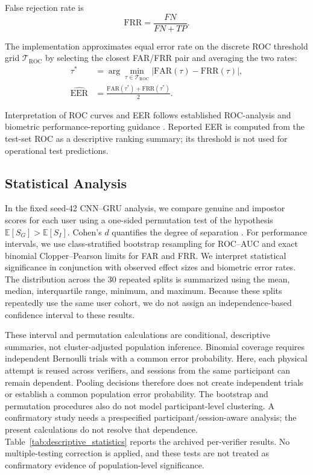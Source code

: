 \documentclass[conference]{IEEEtran}
\begin{document}
False rejection rate is
\begin{equation}
\mathrm{FRR}
=
\frac{FN}{FN+TP}.
\label{eq:frr}
\end{equation}

The implementation approximates equal error rate on the discrete ROC
threshold grid $\mathcal{T}_{\mathrm{ROC}}$ by selecting the closest FAR/FRR
pair and averaging the two rates:
\begin{equation}
\begin{aligned}
\tau^* &= \arg\min_{\tau\in\mathcal{T}_{\mathrm{ROC}}}
|\mathrm{FAR}(\tau)-\mathrm{FRR}(\tau)|,\\
\widehat{\mathrm{EER}} &=
\frac{\mathrm{FAR}(\tau^*)+\mathrm{FRR}(\tau^*)}{2}.
\end{aligned}
\label{eq:eer}
\end{equation}

Interpretation of ROC curves and EER follows established ROC-analysis and biometric performance-reporting guidance \cite{fawcettROC,isoBiometricTesting}.
Reported EER is computed from the test-set ROC as a descriptive ranking
summary; its threshold is not used for operational test predictions.

\subsection{Statistical Analysis}

In the fixed seed-42 CNN--GRU analysis, we compare genuine and impostor scores for each user using a one-sided permutation test of the hypothesis $\mathbb{E}[S_G]>\mathbb{E}[S_I]$. Cohen's $d$ quantifies the degree of separation \cite{cohenPower}. For performance intervals, we use class-stratified bootstrap resampling for ROC--AUC \cite{efronBootstrap} and exact binomial Clopper--Pearson limits \cite{clopperPearson} for FAR and FRR. We interpret statistical significance in conjunction with observed effect sizes and biometric error rates. The distribution across the 30 repeated splits is summarized using the mean, median, interquartile range, minimum, and maximum. Because these splits repeatedly use the same user cohort, we do not assign an independence-based confidence interval to these results.

These interval and permutation calculations are conditional, descriptive
summaries, not cluster-adjusted population inference. Binomial coverage
requires independent Bernoulli trials with a common error probability.
Here, each physical attempt is reused across verifiers, and sessions from the
same participant can remain dependent. Pooling decisions therefore does not
create independent trials or establish a common population error probability.
The bootstrap and permutation procedures also do not model participant-level
clustering. A confirmatory study needs a prespecified participant/session-aware
analysis; the present calculations do not resolve that dependence.
Table~\ref{tab:descriptive_statistics} reports the archived per-verifier results.
No multiple-testing correction is applied, and these tests are not treated as
confirmatory evidence of population-level significance.
\end{document}
